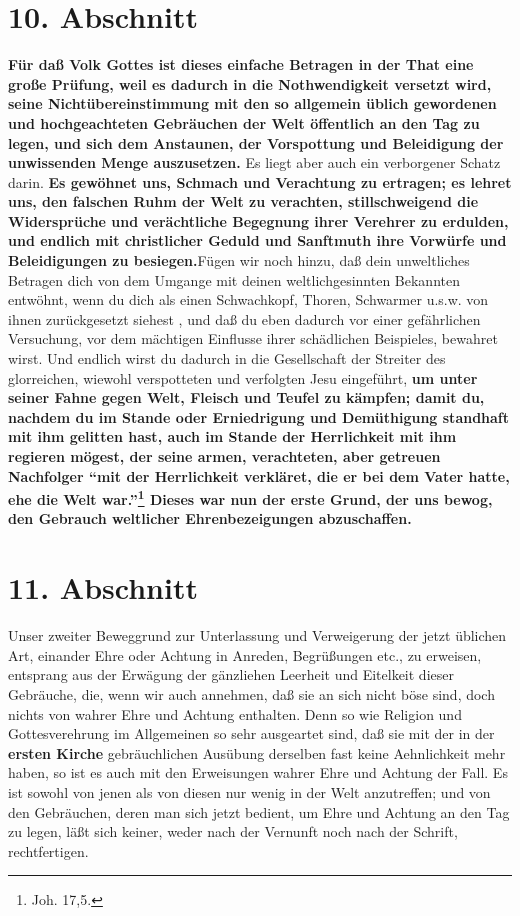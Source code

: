 \section{10. Abschnitt} \label{kap9_ab10}

\textbf{Für daß Volk Gottes ist dieses einfache Betragen in der That eine große Prüfung,
weil es dadurch in die Nothwendigkeit versetzt wird, seine Nichtübereinstimmung
mit den so allgemein üblich gewordenen und hochgeachteten Gebräuchen der Welt
öffentlich an den Tag zu legen, und sich dem Anstaunen, der Vorspottung und
Beleidigung der unwissenden Menge auszusetzen.} Es liegt aber auch ein
verborgener Schatz darin. \textbf{Es gewöhnet uns, Schmach und Verachtung zu ertragen;
es lehret uns, den falschen Ruhm der Welt zu verachten, stillschweigend die
Widersprüche und verächtliche Begegnung ihrer Verehrer zu erdulden, und endlich
mit christlicher Geduld und Sanftmuth ihre Vorwürfe und Beleidigungen zu
besiegen.}Fügen wir noch hinzu, daß dein unweltliches Betragen dich von dem
Umgange mit deinen weltlichgesinnten Bekannten entwöhnt, wenn du dich als einen
Schwachkopf, Thoren, Schwarmer u.s.w. von ihnen zurückgesetzt siehest , und daß
du eben dadurch vor einer gefährlichen Versuchung, vor dem mächtigen Einflusse
ihrer schädlichen Beispieles, bewahret wirst. Und endlich wirst du dadurch in
die Gesellschaft der Streiter des glorreichen, wiewohl verspotteten und
verfolgten Jesu eingeführt, \textbf{um unter seiner Fahne gegen Welt, Fleisch und Teufel
zu kämpfen; damit du, nachdem du im Stande oder Erniedrigung und Demüthigung
standhaft mit ihm gelitten hast, auch im Stande der Herrlichkeit mit ihm
regieren mögest, der seine armen, verachteten, aber getreuen Nachfolger "`mit
der Herrlichkeit verkläret, die er bei dem Vater hatte, ehe die Welt
war."'\footnote{Joh. 17,5.} Dieses war nun der erste Grund, der uns bewog, den
Gebrauch weltlicher Ehrenbezeigungen abzuschaffen.}

\section{11. Abschnitt} \label{kap9_ab11}

Unser zweiter Beweggrund zur Unterlassung und Verweigerung der jetzt üblichen
Art, einander Ehre oder Achtung in Anreden, Begrüßungen etc., zu erweisen,
entsprang aus der Erwägung der gänzliehen Leerheit und Eitelkeit dieser
Gebräuche, die, wenn wir auch annehmen, daß sie an sich nicht böse sind, doch
nichts von wahrer Ehre und Achtung enthalten. Denn so wie Religion und
Gottesverehrung im Allgemeinen so sehr ausgeartet sind, daß sie mit der in der
\textbf{ersten Kirche} gebräuchlichen Ausübung derselben fast keine Aehnlichkeit mehr
haben, so ist es auch mit den Erweisungen wahrer Ehre und Achtung der Fall. Es
ist sowohl von jenen als von diesen nur wenig in der Welt anzutreffen; und von
den Gebräuchen, deren man sich jetzt bedient, um Ehre und Achtung an den Tag zu
legen, läßt sich keiner, weder nach der Vernunft noch nach der Schrift,
rechtfertigen.

